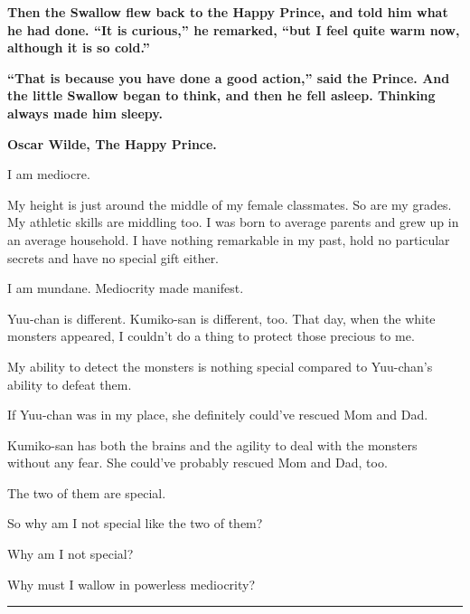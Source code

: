 
\begin{center}
\begin{tcolorbox}[width=0.75\textwidth,colback=darkgray,colupper=white]

\textbf{Then the Swallow flew back to the Happy Prince, and told him what he had done.  ``It is curious,'' he remarked, ``but I feel quite warm now, although it is so cold.''}

\vspace{\baselineskip}

\textbf{``That is because you have done a good action,'' said the Prince.  And the little Swallow began to think, and then he fell asleep.  Thinking always made him sleepy.}

\bigskip

\textbf{Oscar Wilde, The Happy Prince.}
\end{tcolorbox}
\end{center}

I am mediocre.

My height is just around the middle of my female classmates. So are my grades. My athletic skills are middling too. I was born to average parents and grew up in an average household. I have nothing remarkable in my past, hold no particular secrets and have no special gift either.

I am mundane. Mediocrity made manifest.

Yuu-chan is different. Kumiko-san is different, too. That day, when the white monsters appeared, I couldn't do a thing to protect those precious to me.

My ability to detect the monsters is nothing special compared to Yuu-chan's ability to defeat them.

If Yuu-chan was in my place, she definitely could've rescued Mom and Dad.

Kumiko-san has both the brains and the agility to deal with the monsters without any fear. She could've probably rescued Mom and Dad, too.

The two of them are special.

So why am I not special like the two of them?

Why am I not special?

Why must I wallow in powerless mediocrity?

\vspace{\baselineskip}
\hrule
\vspace{\baselineskip}

